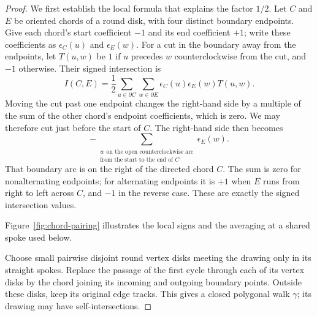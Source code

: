 \begin{proof}
We first establish the local formula that explains the factor $1/2$.
Let $C$ and $E$ be oriented chords of a round disk, with four distinct
boundary endpoints.  Give each chord's start coefficient $-1$ and its
end coefficient $+1$; write these coefficients as $\epsilon_C(u)$ and
$\epsilon_E(w)$.  For a cut in the boundary away from the endpoints,
let $T(u,w)$ be $1$ if $u$ precedes $w$ counterclockwise from the cut,
and $-1$ otherwise.  Their signed intersection is
\begin{equation}
 \label{eq:chord-formula}
 I(C,E)=\frac12\sum_{u\in\partial C}\sum_{w\in\partial E}
       \epsilon_C(u)\epsilon_E(w)T(u,w).
\end{equation}
Moving the cut past one endpoint changes the right-hand side by a
multiple of the sum of the other chord's endpoint coefficients, which
is zero.  We may therefore cut just before the start of $C$.
The right-hand side then becomes
\[
 -\sum_{\substack{w\text{ on the open counterclockwise arc}\\
                 \text{from the start to the end of }C}}
        \epsilon_E(w).
\]
That boundary arc is on the right of the directed chord $C$.  The sum
is zero for nonalternating endpoints; for alternating endpoints it is
$+1$ when $E$ runs from right to left across $C$, and $-1$ in the reverse
case.  These are exactly the signed intersection values.

Figure~\ref{fig:chord-pairing} illustrates the local signs and the
averaging at a shared spoke used below.


Choose small pairwise disjoint round vertex disks meeting the drawing
only in its straight spokes.  Replace the passage of the first cycle
through each of its vertex disks by the chord joining its incoming
and outgoing boundary points.  Outside these disks, keep its original
edge tracks.  This gives a closed polygonal walk $\gamma$; its drawing
may have self-intersections.


\end{proof}
